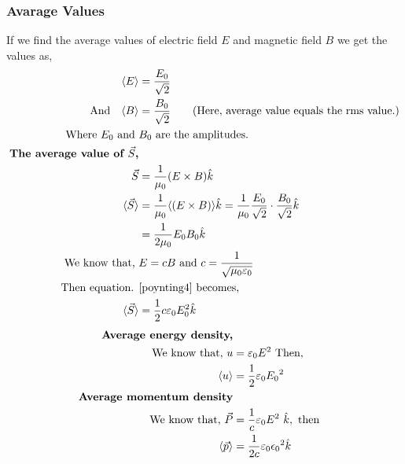 \subsubsection{Avarage Values}
If we find the average values of  electric field $E$ and magnetic field $B$ we get the values as,
\begin{align}
\langle E\rangle &=\frac{{E_{0}}}{\sqrt{2}} \\\text{And} \quad \langle B\rangle &=\frac{{B_{0}}}{\sqrt{2}} \qquad\text{(Here, average value equals the rms value.)} \\
\text{Where  $ E_{0} $ and }&\text{$B_{0}$ are the amplitudes.}\\
\text{\textbf{The average value of $\vec{S}$,}}\\
\vec{S}&=\frac{1}{\mu_{0}}(E\times B) \hat{k}\\
\langle \vec{S}\rangle &= \frac{1}{\mu_{0}} \langle (E\times B)\rangle  \hat{k}=  \frac{1}{\mu_{0}} \frac{{E_{0}}}{\sqrt{2}} \cdot \frac{{B_{0}}}{\sqrt{2}} \hat{k}\\
&=\frac{1}{2\mu_{0}} E_{0} B_{0} \hat{k}\label{poynting4}\\
\text{We know that, }&\text{$E=cB$ and $c=\frac{1}{\sqrt{\mu_{0} \varepsilon_{0}}}$}\\
\text{Then equation. }&\text{\ref{poynting4} becomes,}\\
\langle \vec{S}\rangle &= \frac{1}{2} c\varepsilon_{0} E_{0}^{2} \hat{k}
\end{align}
\begin{align*}
\text{\textbf{Average energy density,}}\\
\text{We know that, }u&=\varepsilon_{0} E^{2}\text{ Then,}\\
\langle u\rangle&=\frac{1}{2}\varepsilon_{0} {E_0}^{2}\\
\text{\textbf{Average momentum density}}\\
\text {We know that, }\vec{P} &=\frac{1}{c} \varepsilon_{0} {E}^{2} \ \hat{k},\text{ then}\\
\langle\vec{p}\rangle&=\frac{1}{2c}\varepsilon_{0} {\epsilon_0}^{2} \hat{k}
\end{align*}
